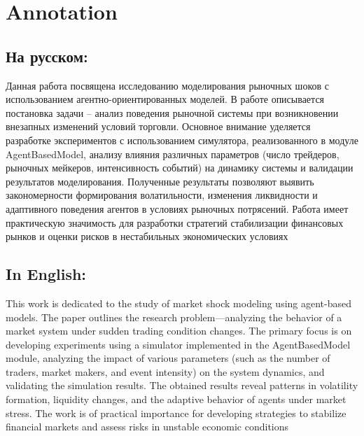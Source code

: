 \section{Annotation}

\subsection{На русском:}

Данная работа посвящена исследованию моделирования рыночных шоков с использованием агентно-ориентированных моделей.
В работе описывается постановка задачи – анализ поведения рыночной системы при возникновении внезапных изменений условий торговли.
Основное внимание уделяется разработке экспериментов с использованием симулятора, реализованного в модуле AgentBasedModel, анализу влияния различных параметров (число трейдеров, рыночных мейкеров, интенсивность событий) на динамику системы и валидации результатов моделирования.
Полученные результаты позволяют выявить закономерности формирования волатильности, изменения ликвидности и адаптивного поведения агентов в условиях рыночных потрясений.
Работа имеет практическую значимость для разработки стратегий стабилизации финансовых рынков и оценки рисков в нестабильных экономических условиях

\subsection{In English:}

This work is dedicated to the study of market shock modeling using agent-based models.
The paper outlines the research problem—analyzing the behavior of a market system under sudden trading condition changes.
The primary focus is on developing experiments using a simulator implemented in the AgentBasedModel module, analyzing the impact of various parameters (such as the number of traders, market makers, and event intensity) on the system dynamics, and validating the simulation results.
The obtained results reveal patterns in volatility formation, liquidity changes, and the adaptive behavior of agents under market stress.
The work is of practical importance for developing strategies to stabilize financial markets and assess risks in unstable economic conditions
